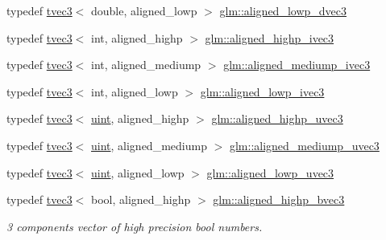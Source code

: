 \begin{DoxyCompactItemize}
\item 
typedef \hyperlink{structglm_1_1tvec3}{tvec3}$<$ double, aligned\+\_\+lowp $>$ \hyperlink{group__gtc__type__aligned_ga858a0e5240ebf37327c00aa040e5ed42}{glm\+::aligned\+\_\+lowp\+\_\+dvec3}
\item 
typedef \hyperlink{structglm_1_1tvec3}{tvec3}$<$ int, aligned\+\_\+highp $>$ \hyperlink{group__gtc__type__aligned_gac7f1892e381baa066488c0b6d1bf16ad}{glm\+::aligned\+\_\+highp\+\_\+ivec3}
\item 
typedef \hyperlink{structglm_1_1tvec3}{tvec3}$<$ int, aligned\+\_\+mediump $>$ \hyperlink{group__gtc__type__aligned_gad97de0d98f61227f3504dcd5f965ff3a}{glm\+::aligned\+\_\+mediump\+\_\+ivec3}
\item 
typedef \hyperlink{structglm_1_1tvec3}{tvec3}$<$ int, aligned\+\_\+lowp $>$ \hyperlink{group__gtc__type__aligned_ga1d549dde64a05e6fcbc23a73563a077c}{glm\+::aligned\+\_\+lowp\+\_\+ivec3}
\item 
typedef \hyperlink{structglm_1_1tvec3}{tvec3}$<$ \hyperlink{group__core__precision_ga4fd29415871152bfb5abd588334147c8}{uint}, aligned\+\_\+highp $>$ \hyperlink{group__gtc__type__aligned_gac7b68f6ca0c6a536c9692bfb885a0006}{glm\+::aligned\+\_\+highp\+\_\+uvec3}
\item 
typedef \hyperlink{structglm_1_1tvec3}{tvec3}$<$ \hyperlink{group__core__precision_ga4fd29415871152bfb5abd588334147c8}{uint}, aligned\+\_\+mediump $>$ \hyperlink{group__gtc__type__aligned_ga7d2ad25929896f2c0fa15eec440b8074}{glm\+::aligned\+\_\+mediump\+\_\+uvec3}
\item 
typedef \hyperlink{structglm_1_1tvec3}{tvec3}$<$ \hyperlink{group__core__precision_ga4fd29415871152bfb5abd588334147c8}{uint}, aligned\+\_\+lowp $>$ \hyperlink{group__gtc__type__aligned_ga3d3b253d6dc1d1ac3b1732f65fd83901}{glm\+::aligned\+\_\+lowp\+\_\+uvec3}
\item 
\mbox{\label{group__gtc__type__aligned_gadd773554f8ca95a959a269252ad20738}} 
typedef \hyperlink{structglm_1_1tvec3}{tvec3}$<$ bool, aligned\+\_\+highp $>$ \hyperlink{group__gtc__type__aligned_gadd773554f8ca95a959a269252ad20738}{glm\+::aligned\+\_\+highp\+\_\+bvec3}
\begin{DoxyCompactList}\small\item\em 3 components vector of high precision bool numbers. \end{DoxyCompactList}\item 
\mbox{\label{group__gtc__type__aligned_gaf2b80c6765cdb6cd9c4458ad5f0e66a2}} 

\end{DoxyCompactItemize}
